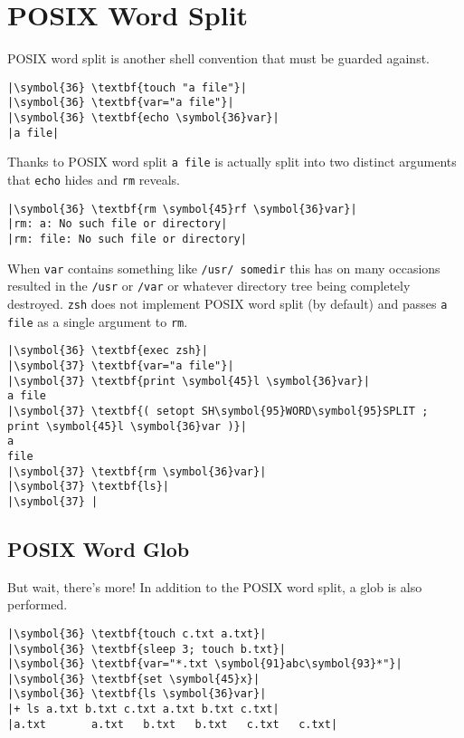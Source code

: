 \documentclass[10pt,a4paper]{article}
\begin{document}
\section*{POSIX Word Split}

POSIX word split is another shell convention that must be guarded against.

\begin{lstlisting}
|\symbol{36} \textbf{touch "a file"}|
|\symbol{36} \textbf{var="a file"}|
|\symbol{36} \textbf{echo \symbol{36}var}|
|a file|
\end{lstlisting}

Thanks to POSIX word split \texttt{a file} is actually split into two distinct
arguments that \texttt{echo} hides and \texttt{rm} reveals.

\begin{lstlisting}
|\symbol{36} \textbf{rm \symbol{45}rf \symbol{36}var}|
|rm: a: No such file or directory|
|rm: file: No such file or directory|
\end{lstlisting}

When \texttt{var} contains something like \texttt{/usr/
somedir} this has on many occasions resulted in the \texttt{/usr} or
\texttt{/var} or whatever directory tree being completely destroyed.
\texttt{zsh} does not implement POSIX word split (by default) and passes
\texttt{a file} as a single argument to \texttt{rm}.

\begin{lstlisting}
|\symbol{36} \textbf{exec zsh}|
|\symbol{37} \textbf{var="a file"}|
|\symbol{37} \textbf{print \symbol{45}l \symbol{36}var}|
a file
|\symbol{37} \textbf{( setopt SH\symbol{95}WORD\symbol{95}SPLIT ; print \symbol{45}l \symbol{36}var )}|
a
file
|\symbol{37} \textbf{rm \symbol{36}var}|
|\symbol{37} \textbf{ls}|
|\symbol{37} |
\end{lstlisting}

\subsection*{POSIX Word Glob}

But wait, there's more! In addition to the POSIX word split, a glob is
also performed.

\begin{lstlisting}
|\symbol{36} \textbf{touch c.txt a.txt}|
|\symbol{36} \textbf{sleep 3; touch b.txt}|
|\symbol{36} \textbf{var="*.txt \symbol{91}abc\symbol{93}*"}|
|\symbol{36} \textbf{set \symbol{45}x}|
|\symbol{36} \textbf{ls \symbol{36}var}|
|+ ls a.txt b.txt c.txt a.txt b.txt c.txt|
|a.txt       a.txt   b.txt   b.txt   c.txt   c.txt|
\end{lstlisting}
\end{document}
